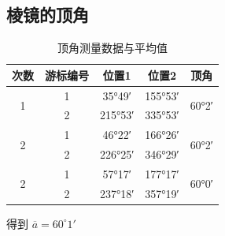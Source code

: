 \documentclass[12pt]{article}
\begin{document}
\subsection{棱镜的顶角}
\begin{table}[H]
\centering
\caption{顶角测量数据与平均值}
\begin{tabular}{ccccc}
\hline
次数 & 游标编号 & 位置1 & 位置2 & 顶角 \\ \hline
\multirow{2}{*}{1} & 1 & 35°49′ & 155°53′ & \multirow{2}{*}{60°2′} \\ \cline{2-4}
  & 2 & 215°53′ & 335°53′ &  \\ \hline
\multirow{2}{*}{2} & 1 & 46°22′ & 166°26′ & \multirow{2}{*}{60°2′} \\ \cline{2-4}
  & 2 & 226°25′ & 346°29′ &  \\ \hline
\multirow{2}{*}{2} & 1 & 57°17′ & 177°17′ & \multirow{2}{*}{60°0′} \\ \cline{2-4}
  & 2 & 237°18′ & 357°19′ &  \\ \hline
\end{tabular}
\end{table}


得到 $\overline a=60^\circ1'$
\end{document}

